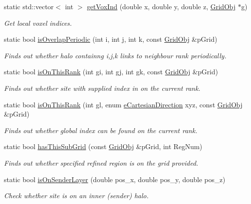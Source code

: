 \begin{DoxyCompactItemize}
static std\+::vector$<$ int $>$ \hyperlink{class_grid_utils_ad6d26dfc410f88cb0901464a58c594ac}{get\+Vox\+Ind} (double x, double y, double z, \hyperlink{class_grid_obj}{Grid\+Obj} $\ast$g)
\begin{DoxyCompactList}\small\item\em Get local voxel indices. \end{DoxyCompactList}\item 
static bool \hyperlink{class_grid_utils_a7c13884020ab181ee8cb6dd2ea7e4fd7}{is\+Overlap\+Periodic} (int i, int j, int k, const \hyperlink{class_grid_obj}{Grid\+Obj} \&p\+Grid)
\begin{DoxyCompactList}\small\item\em Finds out whether halo containng i,j,k links to neighbour rank periodically. \end{DoxyCompactList}\item 
static bool \hyperlink{class_grid_utils_ac1c2d23d0cdd548368aaaffb4f22502d}{is\+On\+This\+Rank} (int gi, int gj, int gk, const \hyperlink{class_grid_obj}{Grid\+Obj} \&p\+Grid)
\begin{DoxyCompactList}\small\item\em Finds out whether site with supplied index in on the current rank. \end{DoxyCompactList}\item 
static bool \hyperlink{class_grid_utils_a1d9558846f757c6f60fa61f104b63071}{is\+On\+This\+Rank} (int gl, enum \hyperlink{_grid_utils_8h_afbad8e4a2f1e9903755b1bd2fe8273cf}{e\+Cartesian\+Direction} xyz, const \hyperlink{class_grid_obj}{Grid\+Obj} \&p\+Grid)
\begin{DoxyCompactList}\small\item\em Finds out whether global index can be found on the current rank. \end{DoxyCompactList}\item 
static bool \hyperlink{class_grid_utils_a0863e64842ddc907d0a2ab22b9624e07}{has\+This\+Sub\+Grid} (const \hyperlink{class_grid_obj}{Grid\+Obj} \&p\+Grid, int Reg\+Num)
\begin{DoxyCompactList}\small\item\em Finds out whether specified refined region is on the grid provided. \end{DoxyCompactList}\item 
static bool \hyperlink{class_grid_utils_af0692236725709af2d98872805fc84ae}{is\+On\+Sender\+Layer} (double pos\+\_\+x, double pos\+\_\+y, double pos\+\_\+z)
\begin{DoxyCompactList}\small\item\em Check whether site is on an inner (sender) halo. \end{DoxyCompactList}\item 

\end{DoxyCompactItemize}
